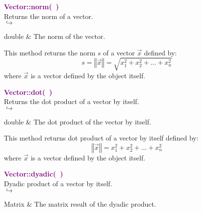 \textcolor{purple}{\textbf{Vector::norm(~)}}\label{Vector::norm()}\\
Returns the norm of a vector.\\ \hspace*{5mm}$\hookrightarrow$
\vspace*{-2em}\begin{tcolorbox}[grow to left by=-1cm, width=\textwidth-1cm,myArgs,tabularx={l|R}]
double & The norm of the vector.
\end{tcolorbox}

This method returns the norm $s$ of a vector $\overrightarrow{x}$ defined by:
\begin{equation*}
s = \left\Vert \overrightarrow{x} \right\Vert = \sqrt {x_{1}^2 + x_{2}^2 + ... + x_{n}^2}
\end{equation*}
where $\overrightarrow{x}$ is a vector defined by the object itself.

\textcolor{purple}{\textbf{Vector::dot(~)}}\label{Vector::dot()}\\
Returns the dot product of a vector by itself.\\ \hspace*{5mm}$\hookrightarrow$
\vspace*{-2em}\begin{tcolorbox}[grow to left by=-1cm, width=\textwidth-1cm,myArgs,tabularx={l|R}]
double & The dot product of the vector by itself.
\end{tcolorbox}

This method returns dot product of a vector by itself defined by:
\begin{equation*}
 \left\Vert \overrightarrow{x} \right\Vert  = x_{1}^2 + x_{2}^2 + ... + x_{n}^2
\end{equation*}
where $\overrightarrow{x}$ is a vector defined by the object itself.

\textcolor{purple}{\textbf{Vector::dyadic(~)}}\label{Vector::dyadic()}\\
Dyadic product of a vector by itself.\\ \hspace*{5mm}$\hookrightarrow$
\vspace*{-2em}\begin{tcolorbox}[grow to left by=-1cm, width=\textwidth-1cm,myArgs,tabularx={l|R}]
Matrix & The matrix result of the dyadic product.
\end{tcolorbox}

